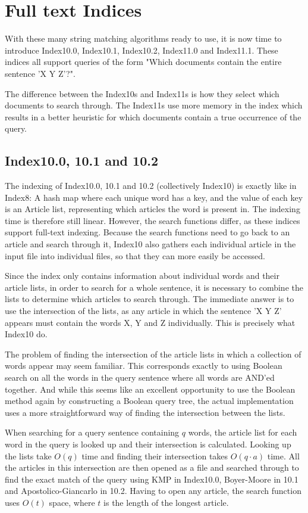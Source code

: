 \section{Full text Indices}\label{sec:index10}

With these many string matching algorithms ready to use, it is now time to introduce Index10.0, Index10.1, Index10.2, Index11.0 and Index11.1. These indices all support queries of the form "Which documents contain the entire sentence 'X Y Z'?". 

The difference between the Index10s and Index11s is how they select which documents to search through. The Index11s use more memory in the index which results in a better heuristic for which documents contain a true occurrence of the query. 

\subsection{Index10.0, 10.1 and 10.2}
The indexing of Index10.0, 10.1 and 10.2 (collectively Index10) is exactly like in Index8: A hash map where each unique word has a key, and the value of each key is an Article list, representing which articles the word is present in. The indexing time is therefore still linear. However, the search functions differ, as these indices support full-text indexing. Because the search functions need to go back to an article and search through it, Index10 also gathers each individual article in the input file into individual files, so that they can more easily be accessed. 

Since the index only contains information about individual words and their article lists, in order to search for a whole sentence, it is necessary to combine the lists to determine which articles to search through. The immediate answer is to use the intersection of the lists, as any article in which the sentence 'X Y Z' appears must contain the words X, Y and Z individually. This is precisely what Index10 do. 

The problem of finding the intersection of the article lists in which a collection of words appear may seem familiar. This corresponds exactly to using Boolean search on all the words in the query sentence where all words are AND'ed together. And while this seems like an excellent opportunity to use the Boolean method again by constructing a Boolean query tree, the actual implementation uses a more straightforward way of finding the intersection between the lists. 

When searching for a query sentence containing $q$ words, the article list for each word in the query is looked up and their intersection is calculated. Looking up the lists take $O(q)$ time and finding their intersection takes $O(q\cdot a)$ time. All the articles in this intersection are then opened as a file and searched through to find the exact match of the query using KMP in Index10.0, Boyer-Moore in 10.1 and Apostolico-Giancarlo in 10.2. Having to open any article, the search function uses $O(t)$ space, where $t$ is the length of the longest article. 

